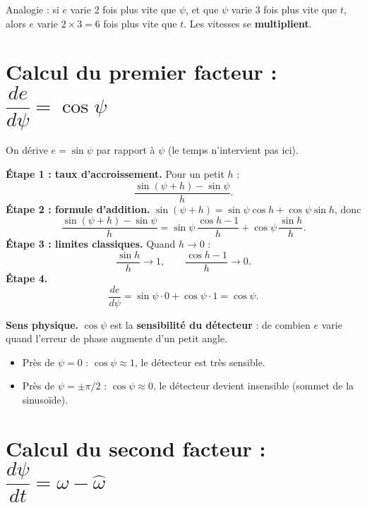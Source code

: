 \documentclass[11pt,a4paper]{article}
\numberwithin{equation}{section}
\newcommand{\hw}{\hat{\omega}}
\begin{document}
\begin{idee}
Analogie : si $e$ varie 2 fois plus vite que $\psi$, et que $\psi$ varie 3 fois plus vite que $t$,
alors $e$ varie $2\times3=6$ fois plus vite que $t$. Les vitesses se \textbf{multiplient}.
\end{idee}

\section{Calcul du premier facteur : $\dfrac{de}{d\psi}=\cos\psi$}

On dérive $e=\sin\psi$ par rapport à $\psi$ (le temps n'intervient pas ici).

\textbf{Étape 1 : taux d'accroissement.} Pour un petit $h$ :
\begin{equation}
\frac{\sin(\psi+h)-\sin\psi}{h}.
\end{equation}
\textbf{Étape 2 : formule d'addition.} $\sin(\psi+h)=\sin\psi\cos h+\cos\psi\sin h$, donc
\begin{equation}
\frac{\sin(\psi+h)-\sin\psi}{h} = \sin\psi\,\frac{\cos h-1}{h} + \cos\psi\,\frac{\sin h}{h}.
\end{equation}
\textbf{Étape 3 : limites classiques.} Quand $h\to0$ :
\begin{equation}
\frac{\sin h}{h}\to1,\qquad \frac{\cos h-1}{h}\to0 .
\end{equation}
\textbf{Étape 4.}
\begin{equation}\label{eq:f1}
\boxed{\frac{de}{d\psi} = \sin\psi\cdot0+\cos\psi\cdot1 = \cos\psi .}
\end{equation}

\textbf{Sens physique.} $\cos\psi$ est la \textbf{sensibilité du détecteur} : de combien $e$ varie quand
l'erreur de phase augmente d'un petit angle.
\begin{itemize}
  \item Près de $\psi=0$ : $\cos\psi\approx1$, le détecteur est très sensible.
  \item Près de $\psi=\pm\pi/2$ : $\cos\psi\approx0$, le détecteur devient insensible (sommet de la sinusoïde).
\end{itemize}

\section{Calcul du second facteur : $\dfrac{d\psi}{dt}=\omega-\hw$}
\end{document}
